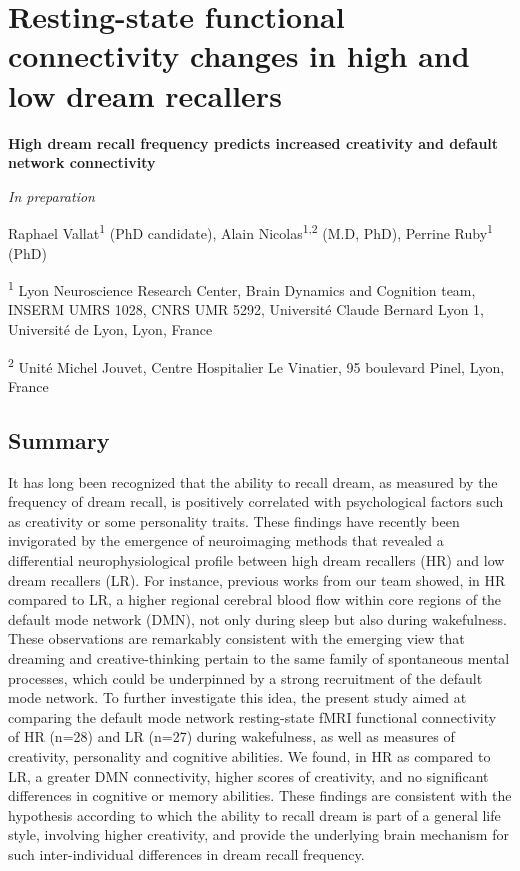 \section{Resting-state functional connectivity changes in high and low dream recallers}
\label{res:inertia:creativity}

\bigskip

\textbf{{\large High dream recall frequency predicts increased creativity and default network connectivity}}

\hfill \emph{In preparation}

\bigskip

Raphael Vallat\textsuperscript{1} (PhD candidate), Alain Nicolas\textsuperscript{1,2} (M.D, PhD), Perrine Ruby\textsuperscript{1} (PhD)

\textsuperscript{1} Lyon Neuroscience Research Center, Brain Dynamics and Cognition team, INSERM UMRS 1028, CNRS UMR 5292, Université Claude Bernard Lyon 1, Université de Lyon, Lyon, France

\textsuperscript{2} Unité Michel Jouvet, Centre Hospitalier Le Vinatier, 95 boulevard Pinel, Lyon, France

\subsection*{Summary}
\label{res:inertia:creativity:summary}
It has long been recognized that the ability to recall dream, as measured by the frequency of dream recall, is positively correlated with psychological factors such as creativity or some personality traits. These findings have recently been invigorated by the emergence of neuroimaging methods that revealed a differential neurophysiological profile between high dream recallers (HR) and low dream recallers (LR). For instance, previous works from our team showed, in HR compared to LR, a higher regional cerebral blood flow within core regions of the default mode network (DMN), not only during sleep but also during wakefulness. These observations are remarkably consistent with the emerging view that dreaming and creative-thinking pertain to the same family of spontaneous mental processes, which could be underpinned by a strong recruitment of the default mode network. To further investigate this idea, the present study aimed at comparing the default mode network resting-state fMRI functional connectivity of HR (n=28) and LR (n=27) during wakefulness, as well as measures of creativity, personality and cognitive abilities. We found, in HR as compared to LR, a greater DMN connectivity, higher scores of creativity, and no significant differences in cognitive or memory abilities. These findings are consistent with the hypothesis according to which the ability to recall dream is part of a general life style, involving higher creativity, and provide the underlying brain mechanism for such inter-individual differences in dream recall frequency.

